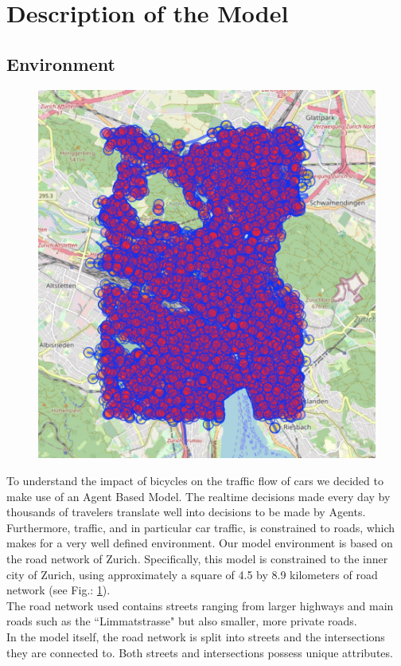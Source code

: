 \section{Description of the Model}
 
\subsection{Environment}
\begin{figure}
  \centering
    \vspace{-0.4cm}
  \includegraphics[width=\linewidth]{./figures/road-network.jpg}
  \label{network}
\end{figure}

To understand the impact of bicycles on the traffic flow of cars we decided to make use of an Agent Based Model.  The realtime decisions made every day by thousands of travelers translate well into decisions to be made by Agents. Furthermore, traffic, and in particular car traffic, is constrained to roads, which makes for a very well defined environment. Our model environment is based on the road network of Zurich. Specifically, this model is constrained to the inner city of Zurich, using approximately a square of 4.5 by 8.9 kilometers of road network (see Fig.: \ref{network}).\\
The road network used contains streets ranging from larger highways and main roads such as the ``Limmatstrasse" but also smaller, more private roads.\\
In the model itself, the road network is split into streets and the intersections they are connected to. Both streets and intersections possess unique attributes. 

